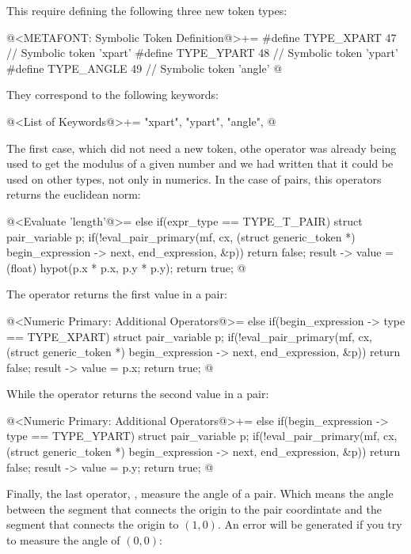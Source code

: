 This require defining the following three new token types:

\iniciocodigo
@<METAFONT: Symbolic Token Definition@>+=
#define TYPE_XPART  47 // Symbolic token 'xpart'
#define TYPE_YPART  48 // Symbolic token 'ypart'
#define TYPE_ANGLE  49 // Symbolic token 'angle'
@
\fimcodigo

They correspond to the following keywords:

\iniciocodigo
@<List of Keywords@>+=
"xpart", "ypart", "angle",
@
\fimcodigo

The first case, which did not need a new token, othe
operator  was already being used to get the modulus
of a given number and we had written that it could be used on other
types, not only in numerics. In the case of pairs, this operators
returns the euclidean norm:

\iniciocodigo
@<Evaluate 'length'@>=
else if(expr_type == TYPE_T_PAIR){
  struct pair_variable p;
  if(!eval_pair_primary(mf, cx, (struct generic_token *)
                                begin_expression -> next, end_expression,
                                &p))
    return false;
  result -> value = (float) hypot(p.x * p.x, p.y * p.y);
  return true;
}
@
\fimcodigo

The operator  returns the first value in a pair:

\iniciocodigo
@<Numeric Primary: Additional Operators@>=
else if(begin_expression -> type == TYPE_XPART){
  struct pair_variable p;
  if(!eval_pair_primary(mf, cx, (struct generic_token *)
                                begin_expression -> next, end_expression,
                                &p))
    return false;
  result -> value = p.x;
  return true;
}
@
\fimcodigo

While the operator  returns the second value in a
pair:

\iniciocodigo
@<Numeric Primary: Additional Operators@>+=
else if(begin_expression -> type == TYPE_YPART){
  struct pair_variable p;
  if(!eval_pair_primary(mf, cx, (struct generic_token *)
                                begin_expression -> next, end_expression,
                                &p))
    return false;
  result -> value = p.y;
  return true;
}
@
\fimcodigo

Finally, the last operator, , measure the angle of a
pair. Which means the angle between the segment that connects the
origin to the pair coordintate and the segment that connects the
origin to $(1,0)$. An error will be generated if you try to measure
the angle of $(0,0)$:

